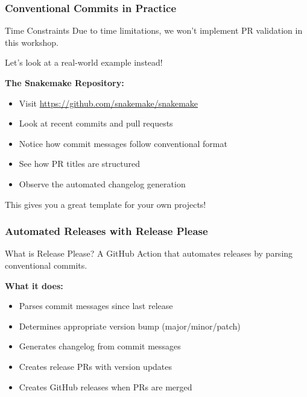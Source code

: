 \begin{frame}
	\frametitle{Conventional Commits in Practice}
	\begin{block}{Time Constraints}
		{Due to time limitations, we won't implement PR validation in this workshop.}
	\end{block}
	\pause
	\begin{docs}
		{Let's look at a real-world example instead!}
	\end{docs}
	\pause
	\textbf{The Snakemake Repository:}
	\begin{itemize}
		\item Visit \url{https://github.com/snakemake/snakemake}
		\item Look at recent commits and pull requests
		\item Notice how commit messages follow conventional format
		\item See how PR titles are structured
		\item Observe the automated changelog generation
	\end{itemize}
	\pause
	\begin{hint}
		{This gives you a great template for your own projects!}
	\end{hint}
\end{frame}

\begin{frame}
	\frametitle{Automated Releases with Release Please}
	\begin{block}{What is Release Please?}
		{A GitHub Action that automates releases by parsing conventional commits.}
	\end{block}
	\pause
	\textbf{What it does:}
	\begin{itemize}
		\item Parses commit messages since last release
		\item Determines appropriate version bump (major/minor/patch)
		\item Generates changelog from commit messages
		\item Creates release PRs with version updates
		\item Creates GitHub releases when PRs are merged
	\end{itemize}
\end{frame}

